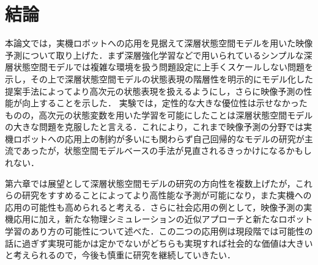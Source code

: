 \documentclass[10pt, twocolumn]{jarticle}
\begin{document}
\section{結論}

本論文では，実機ロボットへの応用を見据えて深層状態空間モデルを用いた映像予測について取り上げた．まず深層強化学習などで用いられているシンプルな深層状態空間モデルでは複雑な環境を扱う問題設定に上手くスケールしない問題を示し，その上で深層状態空間モデルの状態表現の階層性を明示的にモデル化した提案手法によってより高次元の状態表現を扱えるようにし，さらに映像予測の性能が向上することを示した．
実験では，定性的な大きな優位性は示せなかったものの，高次元の状態変数を用いた学習を可能にしたことは深層状態空間モデルの大きな問題を克服したと言える．これにより，これまで映像予測の分野では実機ロボットへの応用上の制約が多いにも関わらず自己回帰的なモデルの研究が主流であったが，状態空間モデルベースの手法が見直されるきっかけになるかもしれない．

第六章では展望として深層状態空間モデルの研究の方向性を複数上げたが，これらの研究をすすめることによってより高性能な予測が可能になり，また実機への応用の可能性も高められると考える．さらに社会応用の例として，映像予測の実機応用に加え，新たな物理シミュレーションの近似アプローチと新たなロボット学習のあり方の可能性について述べた．この二つの応用例は現段階では可能性の話に過ぎず実現可能かは定かでないがどちらも実現すれば社会的な価値は大きいと考えられるので，今後も慎重に研究を継続していきたい．



\end{document}

